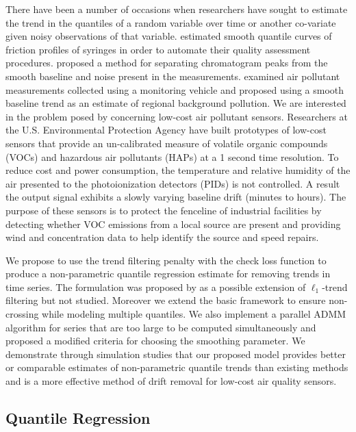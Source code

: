 \documentclass[12pt]{article}
\begin{document}
	There have been a number of occasions when researchers have sought to estimate the trend in the quantiles of a random variable over time or another co-variate given noisy observations of that variable. \cite{nychka1995nonparametric} estimated smooth quantile curves of friction profiles of syringes in order to automate their quality assessment procedures. \cite{Ning2014} proposed a method for separating chromatogram peaks from the smooth baseline and noise present in the measurements. \cite{brantley2014mobile} examined air pollutant measurements collected using a monitoring vehicle and proposed using a smooth baseline trend as an estimate of regional background pollution. We are interested in the problem posed by \cite{thoma2016south} concerning low-cost air pollutant sensors. Researchers at the U.S. Environmental Protection Agency have built prototypes of low-cost sensors that provide an un-calibrated measure of volatile organic compounds (VOCs) and hazardous air pollutants (HAPs) at a 1 second time resolution. To reduce cost and power consumption, the temperature and relative humidity of the air presented to the photoionization detectors (PIDs) is not controlled. A result the output signal exhibits a slowly varying baseline drift (minutes to hours). The purpose of these sensors is to protect the fenceline of industrial facilities by detecting whether VOC emissions from a local source are present and providing wind and concentration data to help identify the source and speed repairs.      	
	
	
	We propose to use the trend filtering penalty with the check loss function to produce a non-parametric quantile regression estimate for removing trends in time series. The formulation was proposed by \cite{Kim2009} as a possible extension of $\ell_1$-trend filtering but not studied. Moreover we extend the basic framework to ensure non-crossing while modeling multiple quantiles. We also implement a parallel ADMM algorithm for series that are too large to be computed simultaneously and proposed a modified criteria for choosing the smoothing parameter. We demonstrate through simulation studies that our proposed model provides better or comparable estimates of non-parametric quantile trends than existing methods and is a more effective method of drift removal for low-cost air quality sensors. 
		
	\subsection{Quantile Regression}
	
\end{document}
